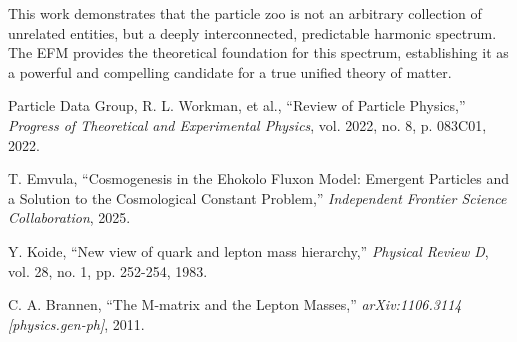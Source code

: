 \documentclass[11pt, twoside]{article}
\begin{document}
This work demonstrates that the particle zoo is not an arbitrary collection of unrelated entities, but a deeply interconnected, predictable harmonic spectrum. The EFM provides the theoretical foundation for this spectrum, establishing it as a powerful and compelling candidate for a true unified theory of matter.


\begin{thebibliography}{9}
\raggedright

Particle Data Group, R. L. Workman, et al., ``Review of Particle Physics,'' \textit{Progress of Theoretical and Experimental Physics}, vol. 2022, no. 8, p. 083C01, 2022.

T. Emvula, ``Cosmogenesis in the Ehokolo Fluxon Model: Emergent Particles and a Solution to the Cosmological Constant Problem,'' \textit{Independent Frontier Science Collaboration}, 2025.

Y. Koide, ``New view of quark and lepton mass hierarchy,'' \textit{Physical Review D}, vol. 28, no. 1, pp. 252-254, 1983.

C. A. Brannen, ``The M-matrix and the Lepton Masses,'' \textit{arXiv:1106.3114 [physics.gen-ph]}, 2011.

\end{thebibliography}
\end{document}
